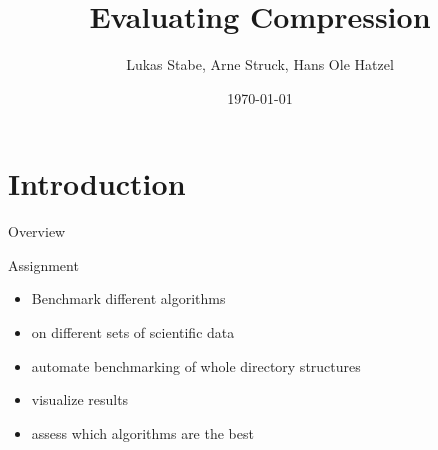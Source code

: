 \documentclass[10pt, compress]{beamer}
\title{Evaluating Compression}
\date{\today}
\author{Lukas Stabe, Arne Struck, Hans Ole Hatzel}
\begin{document}
\begin{frame}
	\maketitle
\end{frame}

\section{Introduction}
\begin{frame}{Overview}
    \tableofcontents
\end{frame}


\begin{frame}{Assignment}
    \begin{itemize}
        \item Benchmark different algorithms
        \item on different sets of scientific data
        \item automate benchmarking of whole directory structures
        \item visualize results
        \item assess which algorithms are the best
    \end{itemize}
\end{frame}
\end{document}
